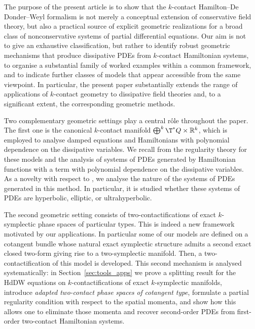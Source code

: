 \documentclass[11pt,a4paper]{article}
\theoremstyle{plain} \newtheorem{theorem}{Theorem}[section] \newtheorem{proposition}[theorem]{Proposition} \newtheorem{corollary}[theorem]{Corollary} \newtheorem{lemma}[theorem]{Lemma} \theoremstyle{definition} \newtheorem{definition}[theorem]{Definition} \theoremstyle{remark} \newtheorem{remark}[theorem]{Remark} \newtheorem{example}[theorem]{Example} %
\begin{document}
The purpose of the present article is to show that the \(k\)-contact Hamilton--De Donder--Weyl formalism is not merely a conceptual extension of conservative field theory, but also a practical source of explicit geometric realizations for a broad class of nonconservative systems of partial differential equations. Our aim is not to give an exhaustive classification, but rather to identify robust geometric mechanisms that produce dissipative PDEs from \(k\)-contact Hamiltonian systems, to organise a substantial family of worked examples within a common framework, and to indicate further classes of models that appear accessible from the same viewpoint. In particular, the present paper substantially extends the range of applications of \(k\)-contact geometry to dissipative field theories and, to a significant extent, the corresponding geometric methods.

Two complementary geometric settings play a central rôle throughout the paper. The first one is the canonical \(k\)-contact manifold \(\bigoplus^k \T^*Q\times\mathbb R^k\), which is employed to analyse damped equations and Hamiltonians with polynomial  dependence on the dissipative variables. We recall from \cite{deLucasLangeSardonRivas2026} the regularity theory for these models and the analysis of systems of PDEs generated by Hamiltonian functions with a term with polynomial dependence on the dissipative variables. As a novelty with respect to \cite{deLucasLangeSardonRivas2026}, we analyse the nature of the systems of PDEs generated in this method. In particular, it is studied whether these systems of PDEs are hyperbolic, elliptic, or ultrahyperbolic. 

The second geometric setting consists of two-contactifications of  exact  $k$-symplectic phase spaces of particular types. This is indeed a new framework motivated by our applications. In particular some of our models are defined on a cotangent bundle whose natural exact symplectic structure admits a second exact closed two-form giving rise to a two-symplectic manifold. Then, a two-contactification of this model is developed. This second mechanism is analysed  systematically: in Section~\ref{sec:tools_apps} we prove a splitting result for the HdDW equations on \(k\)-contactifications of exact \(k\)-symplectic manifolds, introduce {\it adapted two-contact phase spaces of cotangent type}, formulate a partial regularity condition with respect to the spatial momenta, and show how this allows one to eliminate those momenta and recover second-order PDEs from first-order two-contact Hamiltonian systems. 
\end{document}
